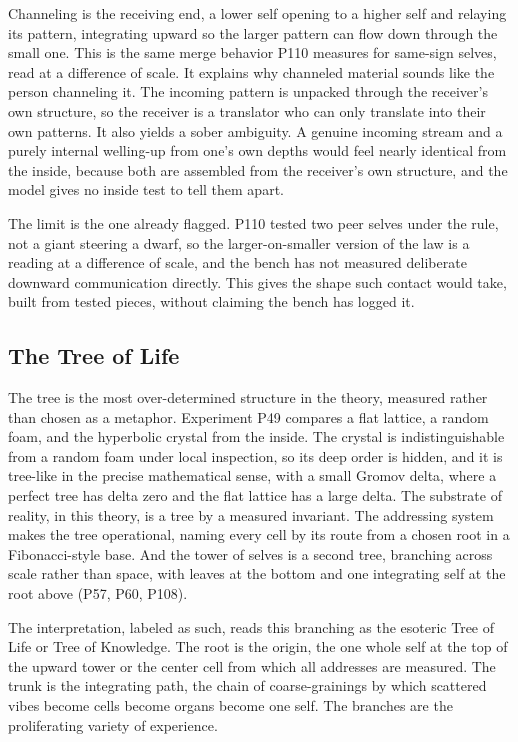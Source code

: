 Channeling is the receiving end, a lower self opening to a higher self and relaying its pattern, integrating upward so the larger pattern can flow down through the small one. This is the same merge behavior P110 measures for same-sign selves, read at a difference of scale. It explains why channeled material sounds like the person channeling it. The incoming pattern is unpacked through the receiver's own structure, so the receiver is a translator who can only translate into their own patterns. It also yields a sober ambiguity. A genuine incoming stream and a purely internal welling-up from one's own depths would feel nearly identical from the inside, because both are assembled from the receiver's own structure, and the model gives no inside test to tell them apart.

The limit is the one already flagged. P110 tested two peer selves under the rule, not a giant steering a dwarf, so the larger-on-smaller version of the law is a reading at a difference of scale, and the bench has not measured deliberate downward communication directly. This gives the shape such contact would take, built from tested pieces, without claiming the bench has logged it.

\subsection{The Tree of Life}

The tree is the most over-determined structure in the theory, measured rather than chosen as a metaphor. Experiment P49 compares a flat lattice, a random foam, and the hyperbolic crystal from the inside. The crystal is indistinguishable from a random foam under local inspection, so its deep order is hidden, and it is tree-like in the precise mathematical sense, with a small Gromov delta, where a perfect tree has delta zero and the flat lattice has a large delta. The substrate of reality, in this theory, is a tree by a measured invariant. The addressing system makes the tree operational, naming every cell by its route from a chosen root in a Fibonacci-style base. And the tower of selves is a second tree, branching across scale rather than space, with leaves at the bottom and one integrating self at the root above (P57, P60, P108).

The interpretation, labeled as such, reads this branching as the esoteric Tree of Life or Tree of Knowledge. The root is the origin, the one whole self at the top of the upward tower or the center cell from which all addresses are measured. The trunk is the integrating path, the chain of coarse-grainings by which scattered vibes become cells become organs become one self. The branches are the proliferating variety of experience.

